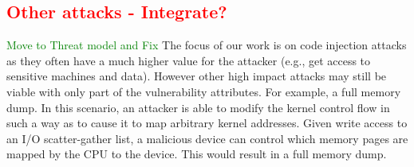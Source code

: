 
\subsection{\textcolor{red}{Other attacks - Integrate?}}
\textcolor{green}{Move to Threat model and Fix}
The focus of our work is on code injection attacks as they often have a much higher value for the attacker (e.g., get access to sensitive machines and data). 
However other high impact attacks may still be viable with only part of the vulnerability attributes. 
For example, a full memory dump.
In this scenario, an attacker is able to modify the kernel control flow in such a way as to cause it to map arbitrary kernel addresses. Given write access to an I/O scatter-gather list, a malicious device can control which memory pages are mapped by the CPU to the device. This would result in a full memory dump.

